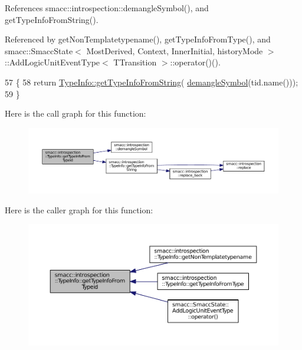 References smacc\+::introspection\+::demangle\+Symbol(), and get\+Type\+Info\+From\+String().



Referenced by get\+Non\+Templatetypename(), get\+Type\+Info\+From\+Type(), and smacc\+::\+Smacc\+State$<$ Most\+Derived, Context, Inner\+Initial, history\+Mode $>$\+::\+Add\+Logic\+Unit\+Event\+Type$<$ T\+Transition $>$\+::operator()().


\begin{DoxyCode}
57 \{
58     \textcolor{keywordflow}{return} \hyperlink{classsmacc_1_1introspection_1_1TypeInfo_a47d65b6c61499d7ae8ab9f6325c84837}{TypeInfo::getTypeInfoFromString}(
      \hyperlink{namespacesmacc_1_1introspection_a2f495108db3e57604d8d3ff5ef030302}{demangleSymbol}(tid.name()));
59 \}
\end{DoxyCode}


Here is the call graph for this function\+:
\nopagebreak
\begin{figure}[H]
\begin{center}
\leavevmode
\includegraphics[width=350pt]{classsmacc_1_1introspection_1_1TypeInfo_a09ec2f3f94a8f1fc82ae250216c38d47_cgraph}
\end{center}
\end{figure}




Here is the caller graph for this function\+:
\nopagebreak
\begin{figure}[H]
\begin{center}
\leavevmode
\includegraphics[width=350pt]{classsmacc_1_1introspection_1_1TypeInfo_a09ec2f3f94a8f1fc82ae250216c38d47_icgraph}
\end{center}
\end{figure}


